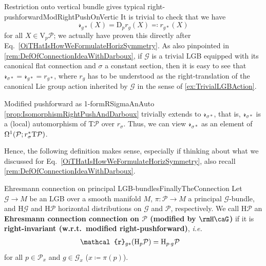 \documentclass[reqno,a4paper,oneside]{amsart}
\theoremstyle{plain}
\theoremstyle{remark}
\theoremstyle{definition}
\begin{document}
\begin{remarks}{Restriction onto vertical bundle gives typical right-pushforward}{ModRightPushOnVertic}
It is trivial to check that we have
\begin{equation*}
\mathcal{r}_{g*}(X)
=
\mathrm{D}_pr_g(X)
\eqqcolon
r_{g*}(X)
\end{equation*}
for all $X \in \mathrm{V}_p\mathcal{P}$; we actually have proven this directly after Eq.\ \eqref{OiTHatIsHowWeFormulateHorizSymmetry}. As also pinpointed in \ref{rem:DefOfConnectionIdeaWithDarboux}, if $\mathcal{G}$ is a trivial LGB equipped with its canonical flat connection and $\sigma$ a constant section, then it is easy to see that $\mathcal{r}_{\sigma*} = \mathcal{r}_{g*} = r_{g*}$, where $r_g$ has to be understood as the right-translation of the canonical Lie group action inherited by $\mathcal{G}$ in the sense of \ref{ex:TrivialLGBAction}.
\end{remarks}

\begin{remarks}{Modified pushforward as 1-form}{RSigmaAnAuto}
\ref{prop:IsomorphismRightPushAndDarboux} trivially extends to $\mathcal{r}_{\sigma*}$, that is, $\mathcal{r}_{\sigma*}$ is a (local) automorphism of $\mathrm{T}\mathcal{P}$ over $r_\sigma$. Thus, we can view $\mathcal{r}_{\sigma*}$ as an element of $\Omega^1\mleft(\mathcal{P}; r_\sigma^*\mathrm{T}\mathcal{P}\mright)$.
\end{remarks}

Hence, the following definition makes sense, especially if thinking about what we discussed for Eq.\ \eqref{OiTHatIsHowWeFormulateHorizSymmetry}, also recall \ref{rem:DefOfConnectionIdeaWithDarboux}.

\begin{definitions}{Ehresmann connection on principal LGB-bundles}{FinallyTheConnection}
Let $\mathcal{G} \to M$ be an LGB over a smooth manifold $M$, $\pi\colon\mathcal{P} \to M$ a principal $\mathcal{G}$-bundle, and $\mathrm{H}\mathcal{G}$ and $\mathrm{H}\mathcal{P}$ horizontal distributions on $\mathcal{G}$ and $\mathcal{P}$, respectively. We call $\mathrm{H}\mathcal{P}$ an \textbf{Ehresmann connection connection on $\mathcal{P}$ (modified by $\rmH\caG$)} if it is \textbf{right-invariant (w.r.t.\ modified right-pushforward)}, \textit{i.e.}\
\begin{align*}
\mathcal{r}_{g*}\mleft( \mathrm{H}_p\mathcal{P} \mright)
&=
\mathrm{H}_{p\cdot g}\mathcal{P}
\end{align*}
for all $p \in \mathcal{P}_x$ and $g \in \mathcal{G}_x$ ($x \coloneqq \pi(p)$).
\end{definitions}
\end{document}
